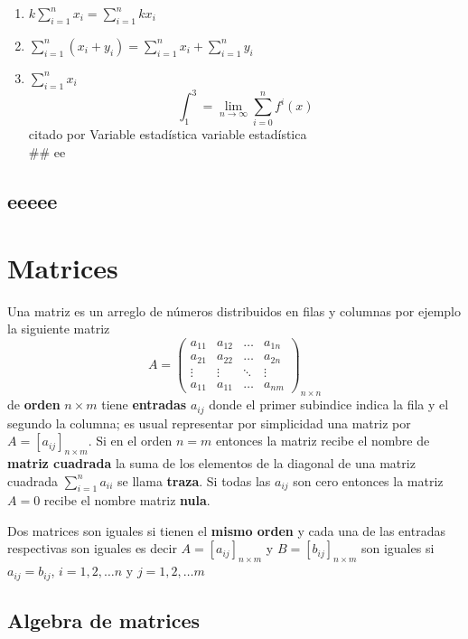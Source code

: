 \documentclass[
  10pt,
]{krantz}
\providecommand{\tightlist}{%
  \setlength{\itemsep}{0pt}\setlength{\parskip}{0pt}}
\theoremstyle{definition}
\theoremstyle{definition}
\theoremstyle{definition}
\theoremstyle{definition}
\theoremstyle{remark}
\begin{document}
\begin{enumerate}
\def\labelenumi{\arabic{enumi}.}
\tightlist
\item
  \(k\sum_{i=1}^nx_i=\sum_{i=1}^nkx_i\)
\item
  \(\sum_{i=1}^n\left(x_i+y_i\right)=\sum_{i=1}^nx_i+\sum_{i=1}^ny_i\)
\item
  \(\sum_{i=1}^nx_i\)
  \[\int_1^3=\lim_{n\to \infty}\sum_{i=0}^{n}f^i(x)\]
  citado por \citep{xie2015}
  Variable estadística variable estadística\\
  \#\# ee
\end{enumerate}

\hypertarget{eeeee}{%
\section{eeeee}\label{eeeee}}

\hypertarget{matrices}{%
\chapter{Matrices}\label{matrices}}

Una matriz es un arreglo de números distribuidos en filas y columnas por ejemplo la siguiente matriz
\[A=\begin{pmatrix}
a_{11}&a_{12}&\ldots&a_{1n}\\
a_{21}&a_{22}&\ldots&a_{2n}\\
\vdots & \vdots & \ddots &\vdots \\
a_{11}&a_{11}&\ldots&a_{nm}
\end{pmatrix}_{n\times n}\]
de \textbf{orden} \(n\times m\) tiene \textbf{entradas} \(a_{ij}\) donde el primer subindice indica la fila y el segundo la columna; es usual representar por simplicidad una matriz por \(A=[a_{ij}]_{n\times m}\). Si en el orden \(n=m\) entonces la matriz recibe el nombre de \textbf{matriz cuadrada} la suma de los elementos de la diagonal de una matriz cuadrada \(\sum_{i=1}^na_{ii}\) se llama \textbf{traza}. Si todas las \(a_{ij}\) son cero entonces la matriz \(A=0\) recibe el nombre matriz \textbf{nula}.

Dos matrices son iguales si tienen el \textbf{mismo orden} y cada una de las entradas respectivas son iguales es decir \(A=[a_{ij}]_{n\times m}\) y \(B=[b_{ij}]_{n\times m}\) son iguales si \(a_{ij}=b_{ij}\), \(i=1,2,\ldots n\) y \(j=1,2,\ldots m\)

\hypertarget{algebra-de-matrices}{%
\section{Algebra de matrices}\label{algebra-de-matrices}}
\end{document}
